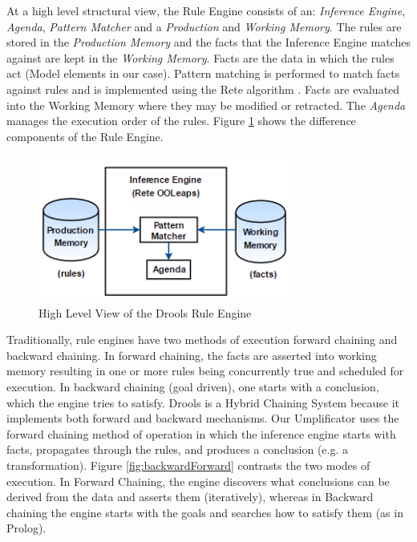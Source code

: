 At a high level structural view, the Rule Engine consists of an: \textit{Inference Engine}, \textit{Agenda}, \textit{Pattern Matcher} and a \textit{Production} and \textit{Working Memory}. 
The rules are stored in the \textit{Production Memory} and the facts that the Inference Engine matches against are kept in the \textit{Working Memory}.
Facts are the data in which the rules act (Model elements in our case).
Pattern matching is performed to match facts against rules and is implemented using the Rete algorithm \cite{reteDROOLS}. Facts are evaluated into the Working Memory where they may be modified or retracted. The \textit{Agenda} manages the execution order of the rules. Figure \ref{fig:RuleEngineArchitecture} shows the difference components of the Rule Engine.

\begin{figure}[h]
\centering
\includegraphics[width=0.75\textwidth]{Figures/RuleEngineArchitecture.png}
\caption{High Level View of the Drools Rule Engine}
\label{fig:RuleEngineArchitecture}
\end{figure}

Traditionally, rule engines have two methods of execution \cite{RulebasedSystems} forward chaining and backward chaining. In forward chaining, the facts are asserted into working memory resulting in one or more rules being concurrently true and scheduled for execution. In backward chaining (goal driven), one starts with a conclusion, which the engine tries to satisfy. Drools is a Hybrid Chaining System because it implements both forward and backward mechanisms. Our Umplificator uses the forward chaining method of operation in which the inference engine starts with facts, propagates through the rules, and produces a conclusion (e.g. a transformation). Figure \ref{fig:backwardForward} contrasts the two modes of execution. In Forward Chaining, the engine discovers what conclusions can be derived from the data and asserts them (iteratively), whereas in Backward chaining the engine starts with the goals and searches how to satisfy them (as in Prolog).

